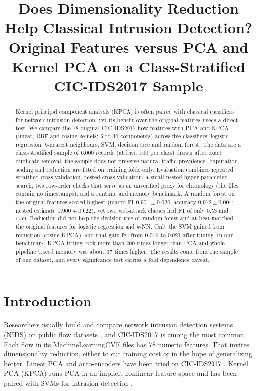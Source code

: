 \documentclass[runningheads]{llncs}
\begin{document}
\title{Does Dimensionality Reduction Help Classical Intrusion Detection? Original Features versus PCA and Kernel PCA on a Class-Stratified CIC-IDS2017 Sample}
\titlerunning{~}
\ifdefined\BLIND
\author{}
\authorrunning{~}
\institute{}
\else
\author{}
\authorrunning{~}
\institute{}
\fi
\maketitle
\begin{abstract}
Kernel principal component analysis (KPCA) is often paired with classical classifiers for network intrusion detection, yet its benefit over the original features needs a direct test. We compare the 78 original CIC-IDS2017 flow features with PCA and KPCA (linear, RBF and cosine kernels; 5 to 30 components) across five classifiers: logistic regression, $k$-nearest neighbours, SVM, decision tree and random forest. The data are a class-stratified sample of 6,000 records (at least 100 per class) drawn after exact duplicate removal; the sample does not preserve natural traffic prevalence. Imputation, scaling and reduction are fitted on training folds only. Evaluation combines repeated stratified cross-validation, nested cross-validation, a small nested hyper-parameter search, two row-order checks that serve as an unverified proxy for chronology (the files contain no timestamps), and a runtime and memory benchmark. A random forest on the original features scored highest (macro-F1 $0.901\pm0.020$; accuracy $0.972\pm0.004$; nested estimate $0.900\pm0.022$), yet two web-attack classes had F1 of only 0.53 and 0.59. Reduction did not help the decision tree or random forest and at best matched the original features for logistic regression and $k$-NN. Only the SVM gained from reduction (cosine KPCA), and that gain fell from 0.076 to 0.021 after tuning. In our benchmark, KPCA fitting took more than 200 times longer than PCA and whole-pipeline traced memory was about 37 times higher. The results come from one sample of one dataset, and every significance test carries a fold-dependence caveat.

\end{abstract}

\section{Introduction}
Researchers usually build and compare network intrusion detection systems (NIDS) on public flow datasets \cite{ring2019}, and CIC-IDS2017 \cite{sharafaldin2018} is among the most common. Each flow in its MachineLearningCVE files has 78 numeric features. That invites dimensionality reduction, either to cut training cost or in the hope of generalizing better. Linear PCA and auto-encoders have been tried on CIC-IDS2017 \cite{abdulhammed2019}. Kernel PCA (KPCA) \cite{scholkopf1998} runs PCA in an implicit nonlinear feature space and has been paired with SVMs for intrusion detection \cite{kuang2014}.
\end{document}
